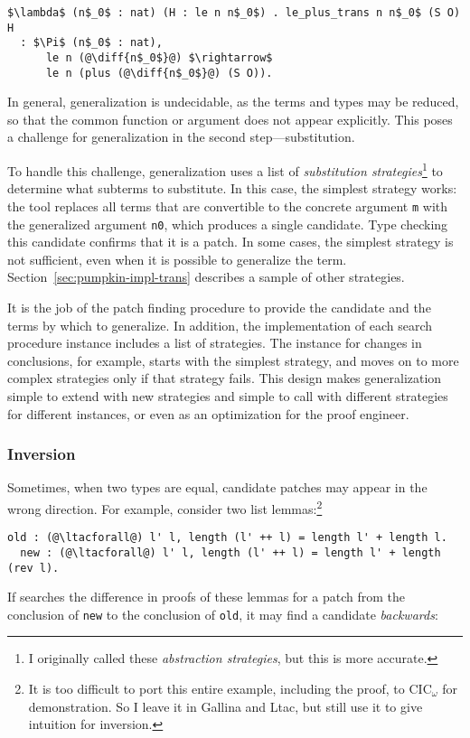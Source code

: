 \begin{lstlisting}[language=coq]
  $\lambda$ (n$_0$ : nat) (H : le n n$_0$) . le_plus_trans n n$_0$ (S O) H
  : $\Pi$ (n$_0$ : nat),
      le n (@\diff{n$_0$}@) $\rightarrow$
      le n (plus (@\diff{n$_0$}@) (S O)).
\end{lstlisting}

In general, generalization is %
undecidable,
as the terms and types may be reduced,
so that the common function or argument does not appear explicitly.
This poses a challenge for generalization in the second step---substitution.

To handle this challenge, generalization uses a list of \textit{substitution strategies}\footnote{I originally called these \textit{abstraction strategies}, but this is more accurate.}
to determine what subterms to substitute.
In this case, the simplest strategy works: the tool
replaces all terms that are convertible to the concrete argument \lstinline{m} with the generalized argument
\lstinline{n0}, which produces a single candidate. Type checking this candidate confirms that it is a patch.
In some cases, the simplest strategy is not sufficient, even when it is possible to generalize the term.
Section~\ref{sec:pumpkin-impl-trans} describes a sample of other strategies.

It is the job of the patch finding procedure to provide the candidate and the terms by which to generalize.
In addition, the implementation of each search procedure instance includes a list of strategies.
The instance for changes in conclusions, for example, starts with the simplest strategy,
and moves on to more complex strategies only if that strategy fails.
This design makes generalization simple to extend with new strategies and simple to call with different strategies
for different instances, or even as an optimization for the proof engineer.

\subsubsection*{Inversion} Sometimes, when two types are  equal,
candidate patches may appear in the wrong direction.
For example, consider two list lemmas:\footnote{It is too difficult to port this entire example, including the proof, to CIC$_{\omega}$ for demonstration.
So I leave it in Gallina and Ltac, but still use it to give intuition for inversion.}

\begin{lstlisting}[language=coq]
  old : (@\ltacforall@) l' l, length (l' ++ l) = length l' + length l.
  new : (@\ltacforall@) l' l, length (l' ++ l) = length l' + length (rev l).
\end{lstlisting} 
If \sysname searches the difference in proofs of these lemmas for a patch from the 
conclusion of \lstinline{new} to the conclusion of \lstinline{old},
it may find a candidate \emph{backwards}:

